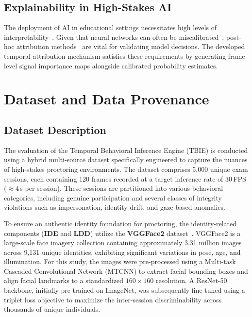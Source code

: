 \documentclass[journal]{IEEEtran}
\begin{document}
\subsection{Explainability in High-Stakes AI}
The deployment of AI in educational settings necessitates high levels of interpretability~\cite{Arrieta2020}. Given that neural networks can often be miscalibrated~\cite{Guo2017}, post-hoc attribution methods~\cite{Sundararajan2017} are vital for validating model decisions. The developed temporal attribution mechanism satisfies these requirements by generating frame-level signal importance maps alongside calibrated probability estimates.

\section{Dataset and Data Provenance}
\label{sec:dataset}

\subsection{Dataset Description}

The evaluation of the Temporal Behavioral Inference Engine (TBIE) is conducted using a hybrid multi-source dataset specifically engineered to capture the nuances of high-stakes proctoring environments. The dataset comprises 5,000 unique exam sessions, each containing 120 frames recorded at a target inference rate of 30\,FPS (${\approx}4$\,s per session). These sessions are partitioned into various behavioral categories, including genuine participation and several classes of integrity violations such as impersonation, identity drift, and gaze-based anomalies.

To ensure an authentic identity foundation for proctoring, the identity-related components (\textbf{IDE} and \textbf{LDD}) utilize the \textbf{VGGFace2} dataset~\cite{Cao2018}. VGGFace2 is a large-scale face imagery collection containing approximately 3.31 million images across 9,131 unique identities, exhibiting significant variations in pose, age, and illumination. For this study, the images were pre-processed using a Multi-task Cascaded Convolutional Network (MTCNN) to extract facial bounding boxes and align facial landmarks to a standardized $160{\times}160$ resolution. A ResNet-50 backbone, initially pre-trained on ImageNet, was subsequently fine-tuned using a triplet loss objective to maximize the inter-session discriminability across thousands of unique individuals.
\end{document}
